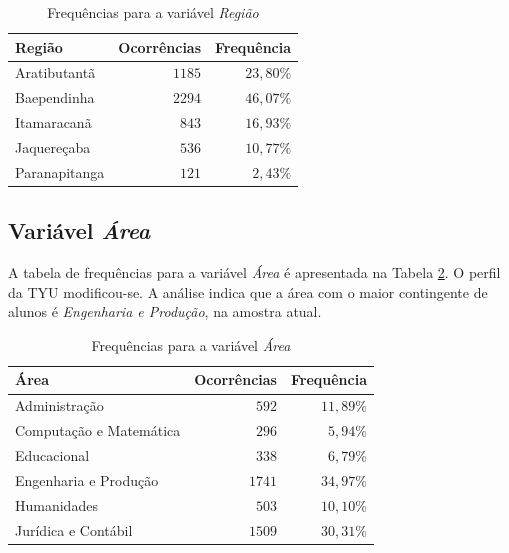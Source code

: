 \documentclass[10pt,a4paper,oneside]{article}
\newcommand{\arat}{Aratibutantã\xspace}
\newcommand{\baep}{Baependinha\xspace}
\newcommand{\itam}{Itamaracanã\xspace}
\newcommand{\jaqu}{Jaquereçaba\xspace}
\newcommand{\para}{Paranapitanga\xspace}
\newcommand{\adm}{Administração\xspace}
\newcommand{\comp}{Computação e Matemática\xspace}
\newcommand{\edu}{Educacional\xspace}
\newcommand{\eng}{Engenharia e Produção\xspace}
\newcommand{\hum}{Humanidades\xspace}
\newcommand{\jur}{Jurídica e Contábil\xspace}
\begin{document}
\begin{table}[h]
\small
\centering
\caption{Frequências para a variável \textit{Região}}
\label{table: frequencias regiao}
\vspace{0.5em}
\begin{tabular}{l r r}
	\toprule
	\textbf{Região} & \textbf{Ocorrências} & \textbf{Frequência} \\
	\midrule
	\arat           & $1185$               & $23,80\%$           \\
	\baep           & $2294$               & $46,07\%$           \\
	\itam           & $843$                & $16,93\%$           \\
	\jaqu           & $536$                & $10,77\%$           \\
	\para           & $121$                & $2,43\%$            \\
	\bottomrule
\end{tabular}
\end{table}

\subsection*{Variável \textit{Área}}

A tabela de frequências para a variável \textit{Área} é apresentada na Tabela \ref{table: frequencias area}. O perfil da TYU modificou-se. A análise indica que a área com o maior contingente de alunos é \textit{\eng}, na amostra atual.

\begin{table}[h]
\small
\centering
\caption{Frequências para a variável \textit{Área}}
\label{table: frequencias area}
\vspace{0.5em}
\begin{tabular}{l r r}
	\toprule
	\textbf{Área} & \textbf{Ocorrências} & \textbf{Frequência} \\
	\midrule
	\adm            & $592$                & $11,89\%$           \\
	\comp           & $296$                & $5,94\%$            \\
	\edu            & $338$                & $6,79\%$            \\
	\eng            & $1741$               & $34,97\%$           \\
	\hum            & $503$                & $10,10\%$           \\
	\jur            & $1509$               & $30,31\%$           \\
	\bottomrule
\end{tabular}
\end{table}
\end{document}
